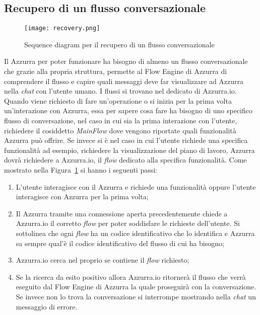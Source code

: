 \subsection{Recupero di un flusso conversazionale}
\begin{figure}[h]
	\begin{center}
		\texttt{[image: recovery.png]}
		\caption{Sequence diagram per il recupero di un flusso conversazionale}\label{fig:recovery}
	\end{center}
\end{figure}
Il  Azzurra per poter funzionare ha bisogno di almeno un flusso conversazionale che grazie alla propria struttura, permette al Flow Engine di Azzurra di comprendere il flusso e capire quali messaggi deve far visualizzare ad Azzurra nella \emph{chat} con l'utente umano. I flussi si trovano nel  dedicato di Azzurra.io. Quando viene richiesto di fare un’operazione o si inizia per la prima volta un'interazione con Azzurra, essa per sapere cosa fare ha bisogno di uno specifico flusso di conversazione, nel caso in cui sia la prima interazione con l'utente, richiedere il cosiddetto \emph{MainFlow} dove vengono riportate quali funzionalità Azzurra può offrire. Se invece si è nel caso in cui l'utente richiede una specifica funzionalità ad esempio, richiedere la visualizzazione del piano di lavoro, Azzurra dovrà richiedere a Azzurra.io, il \emph{flow} dedicato alla specifica funzionalità.
Come mostrato nella Figura~\ref{fig:recovery} si hanno i seguenti passi:
\begin{enumerate}
\item L'utente interagisce con il  Azzurra e richiede una funzionalità oppure l'utente interagisce con Azzurra per la prima volta;
\item Il  Azzurra tramite una connessione aperta precedentemente chiede a Azzurra.io il corretto \emph{flow} per poter soddisfare le richieste dell'utente. Si sottolinea che ogni \emph{flow} ha un codice identificativo che lo identifica e Azzurra sa sempre qual'è il codice identificativo del flusso di cui ha bisogno;
\item Azzurra.io cerca nel proprio  se contiene il \emph{flow} richiesto;
\item Se la ricerca da esito positivo allora Azzurra.io ritornerà il flusso che verrà eseguito dal Flow Engine di Azzurra la quale proseguirà con la conversazione. Se invece non lo trova la conversazione si interrompe mostrando nella \emph{chat} un messaggio di errore.
\end{enumerate}

